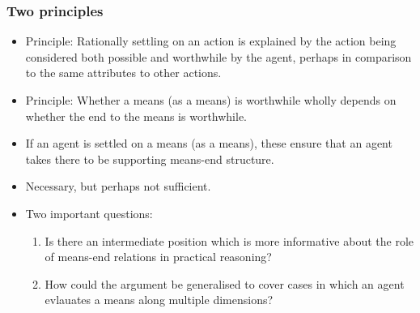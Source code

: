 \documentclass[noamssymb,
]{beamer} %
\newcommand{\hozlinedash}[0]{%
  \noindent\hdashrule[0.5ex][c]{\textwidth}{.1pt}{2.5pt}
}
\begin{document}
\begin{frame}
  \frametitle{Two principles}

  \begin{itemize}
  \item Principle: Rationally settling on an action is explained by the action being considered both possible and worthwhile by the agent, perhaps in comparison to the same attributes to other actions.
  \item Principle: Whether a means (as a means) is worthwhile wholly depends on whether the end to the means is worthwhile.
  \end{itemize}

  \hozlinedash

  \begin{itemize}
  \item If an agent is settled on a means (as a means), these ensure that an agent takes there to be supporting means-end structure.
  \item Necessary, but perhaps not sufficient.
  \end{itemize}

  \begin{itemize}
  \item Two important questions:
    \begin{enumerate}
    \item Is there an intermediate position which is more informative about the role of means-end relations in practical reasoning?
    \item How could the argument be generalised to cover cases in which an agent evlauates a means along multiple dimensions?
    \end{enumerate}
  \end{itemize}

 \end{frame}
\end{document}
